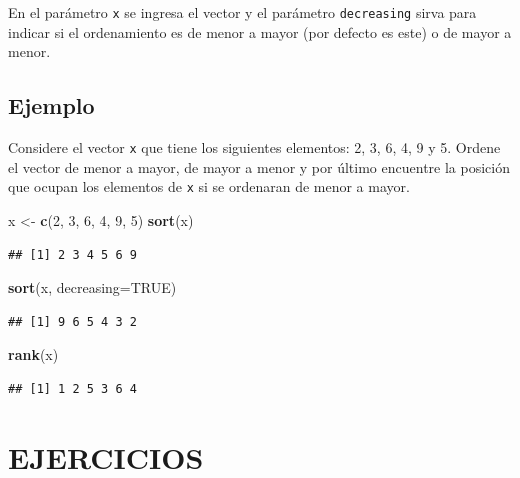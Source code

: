 \documentclass[10pt,]{krantz}
\makeatletter
\newenvironment{Shaded}{\begin{snugshade}}{\end{snugshade}}
\newcommand{\KeywordTok}[1]{\textcolor[rgb]{0.13,0.29,0.53}{\textbf{#1}}}
\newcommand{\DataTypeTok}[1]{\textcolor[rgb]{0.13,0.29,0.53}{#1}}
\newcommand{\DecValTok}[1]{\textcolor[rgb]{0.00,0.00,0.81}{#1}}
\newcommand{\StringTok}[1]{\textcolor[rgb]{0.31,0.60,0.02}{#1}}
\newcommand{\OtherTok}[1]{\textcolor[rgb]{0.56,0.35,0.01}{#1}}
\newcommand{\NormalTok}[1]{#1}
\newenvironment{kframe}{%
\medskip{}
\setlength{\fboxsep}{.8em}
 \def\at@end@of@kframe{}%
 \ifinner\ifhmode%
  \def\at@end@of@kframe{\end{minipage}}%
  \begin{minipage}{\columnwidth}%
 \fi\fi%
 \def\FrameCommand##1{\hskip\@totalleftmargin \hskip-\fboxsep
 \colorbox{shadecolor}{##1}\hskip-\fboxsep
     \hskip-\linewidth \hskip-\@totalleftmargin \hskip\columnwidth}%
 \MakeFramed {\advance\hsize-\width
   \@totalleftmargin\z@ \linewidth\hsize
   \@setminipage}}%
 {\par\unskip\endMakeFramed%
 \at@end@of@kframe}
\renewenvironment{Shaded}{\begin{kframe}}{\end{kframe}}
\makeatother
\begin{document}
En el parámetro \texttt{x} se ingresa el vector y el parámetro
\texttt{decreasing} sirva para indicar si el ordenamiento es de menor a
mayor (por defecto es este) o de mayor a menor.

\subsection*{Ejemplo}\label{ejemplo-14}


Considere el vector \texttt{x} que tiene los siguientes elementos: 2, 3,
6, 4, 9 y 5. Ordene el vector de menor a mayor, de mayor a menor y por
último encuentre la posición que ocupan los elementos de \texttt{x} si
se ordenaran de menor a mayor.

\begin{Shaded}
\begin{Highlighting}[]
\NormalTok{x <-}\StringTok{ }\KeywordTok{c}\NormalTok{(}\DecValTok{2}\NormalTok{, }\DecValTok{3}\NormalTok{, }\DecValTok{6}\NormalTok{, }\DecValTok{4}\NormalTok{, }\DecValTok{9}\NormalTok{, }\DecValTok{5}\NormalTok{)}
\KeywordTok{sort}\NormalTok{(x)}
\end{Highlighting}
\end{Shaded}

\begin{verbatim}
## [1] 2 3 4 5 6 9
\end{verbatim}

\begin{Shaded}
\begin{Highlighting}[]
\KeywordTok{sort}\NormalTok{(x, }\DataTypeTok{decreasing=}\OtherTok{TRUE}\NormalTok{)}
\end{Highlighting}
\end{Shaded}

\begin{verbatim}
## [1] 9 6 5 4 3 2
\end{verbatim}

\begin{Shaded}
\begin{Highlighting}[]
\KeywordTok{rank}\NormalTok{(x)}
\end{Highlighting}
\end{Shaded}

\begin{verbatim}
## [1] 1 2 5 3 6 4
\end{verbatim}

\section*{EJERCICIOS}\label{ejercicios-1}
\end{document}
